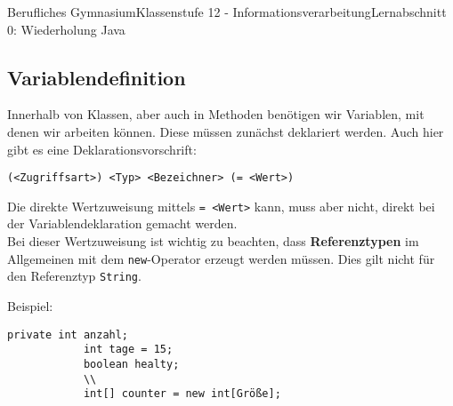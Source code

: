 \documentclass[11pt,oneside,openany,headings=optiontotoc,11pt,numbers=noenddot]{article}
\begin{document}
\begin{worksheet}{Berufliches Gymnasium}{Klassenstufe 12 - Informationsverarbeitung}{Lernabschnitt 0: Wiederholung Java}
		\subsection{Variablendefinition}
		Innerhalb von Klassen, aber auch in Methoden benötigen wir Variablen, mit denen wir arbeiten können. Diese müssen zunächst deklariert werden. Auch hier gibt es eine Deklarationsvorschrift:
		\begin{lstlisting}[style=JavaInputStyle]
			(<Zugriffsart>) <Typ> <Bezeichner> (= <Wert>)
		\end{lstlisting}
		Die direkte Wertzuweisung mittels \lstinline[style=JavaInputStyle]{= <Wert>} kann, muss aber nicht, direkt bei der Variablendeklaration gemacht werden.\\
		Bei dieser \grq{}Wertzuweisung\grq{} ist wichtig zu beachten, dass \textbf{Referenztypen} im Allgemeinen mit dem \lstinline[style=JavaInputStyle]{new}-Operator erzeugt werden müssen. Dies gilt nicht für den Referenztyp \lstinline[style=JavaInputStyle]{String}.\\
		\par\noindent
		Beispiel:
		\begin{lstlisting}[style=JavaInputStyle,frame=single]
			private int anzahl;
			int tage = 15;
			boolean healty;
			\\
			int[] counter = new int[Größe];
		\end{lstlisting}

\end{worksheet}
\end{document}
